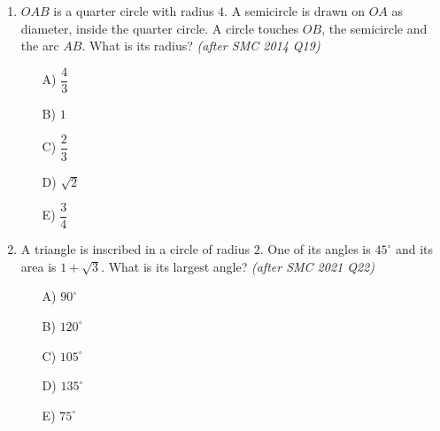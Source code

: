 \documentclass[11pt,a4paper]{article}
\begin{document}
\begin{enumerate}
\item \begin{minipage}[t]{0.60\linewidth}
$OAB$ is a quarter circle with radius $4$. A semicircle is drawn on $OA$ as diameter, inside the quarter circle. A circle touches $OB$, the semicircle and the arc $AB$. What is its radius? \textit{\small(after SMC 2014 Q19)}
\begin{itemize}[itemsep=3pt]
\item[A)] $\dfrac43$
\item[B)] $1$
\item[C)] $\dfrac23$
\item[D)] $\sqrt2$
\item[E)] $\dfrac34$
\end{itemize}
\end{minipage}\hfill
\begin{minipage}[t]{0.36\linewidth}
\vspace{0pt}
\centering
{}
\end{minipage}

\item \begin{minipage}[t]{\linewidth}
A triangle is inscribed in a circle of radius $2$. One of its angles is $45^\circ$ and its area is $1+\sqrt3$. What is its largest angle? \textit{\small(after SMC 2021 Q22)}
\begin{itemize}
\item[A)] $90^\circ$
\item[B)] $120^\circ$
\item[C)] $105^\circ$
\item[D)] $135^\circ$
\item[E)] $75^\circ$
\end{itemize}
\end{minipage}


\end{enumerate}
\end{document}
